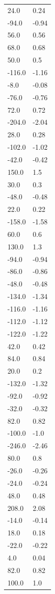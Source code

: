\begin{longtable}{ll}
24.0 & 0.24 \\
-94.0 & -0.94 \\
56.0 & 0.56 \\
68.0 & 0.68 \\
50.0 & 0.5 \\
-116.0 & -1.16 \\
-8.0 & -0.08 \\
-76.0 & -0.76 \\
72.0 & 0.72 \\
-204.0 & -2.04 \\
28.0 & 0.28 \\
-102.0 & -1.02 \\
-42.0 & -0.42 \\
150.0 & 1.5 \\
30.0 & 0.3 \\
-48.0 & -0.48 \\
22.0 & 0.22 \\
-158.0 & -1.58 \\
60.0 & 0.6 \\
130.0 & 1.3 \\
-94.0 & -0.94 \\
-86.0 & -0.86 \\
-48.0 & -0.48 \\
-134.0 & -1.34 \\
-116.0 & -1.16 \\
-112.0 & -1.12 \\
-122.0 & -1.22 \\
42.0 & 0.42 \\
84.0 & 0.84 \\
20.0 & 0.2 \\
-132.0 & -1.32 \\
-92.0 & -0.92 \\
-32.0 & -0.32 \\
82.0 & 0.82 \\
-100.0 & -1.0 \\
-246.0 & -2.46 \\
80.0 & 0.8 \\
-26.0 & -0.26 \\
-24.0 & -0.24 \\
48.0 & 0.48 \\
208.0 & 2.08 \\
-14.0 & -0.14 \\
18.0 & 0.18 \\
-22.0 & -0.22 \\
4.0 & 0.04 \\
82.0 & 0.82 \\
100.0 & 1.0 \\

\end{longtable}
